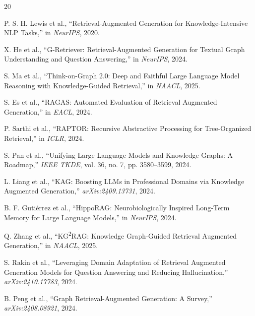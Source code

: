\documentclass[conference]{IEEEtran}
\begin{document}
\begin{thebibliography}{20}

P. S. H. Lewis et al., ``Retrieval-Augmented Generation for Knowledge-Intensive NLP Tasks,'' in \textit{NeurIPS}, 2020.

X. He et al., ``G-Retriever: Retrieval-Augmented Generation for Textual Graph Understanding and Question Answering,'' in \textit{NeurIPS}, 2024.

S. Ma et al., ``Think-on-Graph 2.0: Deep and Faithful Large Language Model Reasoning with Knowledge-Guided Retrieval,'' in \textit{NAACL}, 2025.

S. Es et al., ``RAGAS: Automated Evaluation of Retrieval Augmented Generation,'' in \textit{EACL}, 2024.

P. Sarthi et al., ``RAPTOR: Recursive Abstractive Processing for Tree-Organized Retrieval,'' in \textit{ICLR}, 2024.

S. Pan et al., ``Unifying Large Language Models and Knowledge Graphs: A Roadmap,'' \textit{IEEE TKDE}, vol. 36, no. 7, pp. 3580--3599, 2024.

L. Liang et al., ``KAG: Boosting LLMs in Professional Domains via Knowledge Augmented Generation,'' \textit{arXiv:2409.13731}, 2024.

B. F. Guti\'{e}rrez et al., ``HippoRAG: Neurobiologically Inspired Long-Term Memory for Large Language Models,'' in \textit{NeurIPS}, 2024.

Q. Zhang et al., ``KG\textsuperscript{2}RAG: Knowledge Graph-Guided Retrieval Augmented Generation,'' in \textit{NAACL}, 2025.

S. Rakin et al., ``Leveraging Domain Adaptation of Retrieval Augmented Generation Models for Question Answering and Reducing Hallucination,'' \textit{arXiv:2410.17783}, 2024.

B. Peng et al., ``Graph Retrieval-Augmented Generation: A Survey,'' \textit{arXiv:2408.08921}, 2024.

\end{thebibliography}
\end{document}
